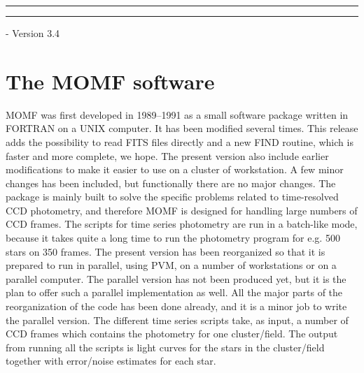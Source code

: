 \documentclass[]{article}
\begin{document}
\newline \rule{15.5cm}{0.3mm}
\vspace{0.1mm}
\newline \rule{15.5cm}{0.3mm}
 - Version 3.4
\vspace{3cm}
\Huge
{}
\vspace{3cm}
\normalsize
{}
\vspace{6mm}
\vspace{4mm}
\vspace{1mm}
\vspace{1mm}
\vspace{1mm}
\vspace{1mm}
\vspace{5mm}
\normalsize
\newpage
\section{The MOMF software}
MOMF was first developed in 1989--1991 as a small software package 
written in
FORTRAN on a UNIX computer. It has been modified several times.
This release adds the possibility to read FITS files directly
and a new FIND routine, which is faster and more complete, we hope.
The present version also include earlier modifications to
make it easier to use on a cluster of workstation. A few minor changes
has been included, but functionally there are no major changes.
The package is mainly built to solve 
the
specific problems related to time-resolved CCD photometry, and therefore
MOMF is designed for handling large numbers of CCD frames.
The scripts for time series photometry are run in a batch-like
mode,
because it takes quite a long time to run the photometry program
for e.g. 500 stars on 350 frames. The present version has been reorganized
so that it is prepared to run in parallel, using PVM, 
on a number of workstations or
on a parallel computer. The parallel version has not been produced yet, but
it is the plan to offer such a parallel implementation as well.
All the major parts of the reorganization of the code has been
done already, and it is a minor job to write the parallel version.
The different time series scripts take, as input, a
number of CCD frames which contains the photometry for one cluster/field.
The output from running all the scripts is light curves for the
stars in the cluster/field together with error/noise estimates for each star.
\end{document}
